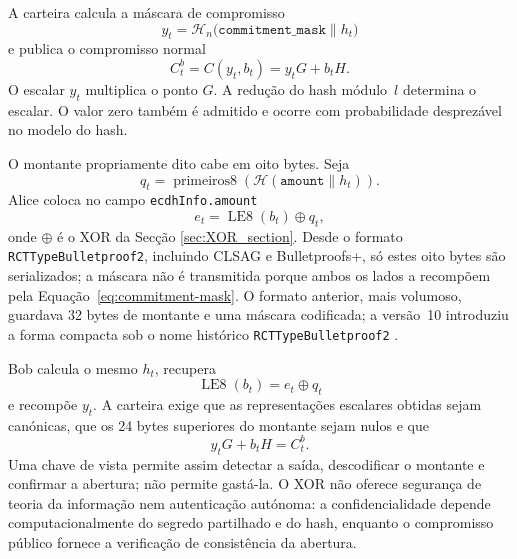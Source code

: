 A carteira calcula a máscara de compromisso
\begin{equation}
 y_t=\mathcal H_n\bigl(
       \texttt{commitment\_mask}\mathbin\|h_t\bigr)
 \label{eq:commitment-mask}
\end{equation}
e publica o compromisso normal
\begin{equation}
 C_t^b=C(y_t,b_t)=y_tG+b_tH.
 \label{eq:output-commitment}
\end{equation}
O escalar \(y_t\) multiplica o ponto \(G\). %
A redução do hash módulo~\(l\) determina o escalar. O valor zero também
é admitido e ocorre com probabilidade desprezável no modelo do hash.

O montante propriamente dito cabe em oito bytes. Seja
\[
 q_t=\operatorname{primeiros8}\!\left(
   \mathcal H(\texttt{amount}\mathbin\|h_t)\right).
\]
Alice coloca no campo \texttt{ecdhInfo.amount}
\begin{equation}
 e_t=\operatorname{LE8}(b_t)\mathbin\oplus q_t,
 \label{eq:encoded-amount}
\end{equation}
onde \(\oplus\) é o XOR da Secção \ref{sec:XOR_section}. Desde o formato
\texttt{RCTTypeBulletproof2}, incluindo CLSAG e Bulletproofs+, só estes oito
bytes são serializados; a máscara não é transmitida porque ambos os lados a
recompõem pela
Equação~\eqref{eq:commitment-mask}. O formato anterior, mais volumoso, guardava
32 bytes de montante e uma máscara codificada; a versão~10 introduziu a forma
compacta sob o nome histórico \texttt{RCTTypeBulletproof2}
\cite{monero-source-v16}.


%
Bob calcula o mesmo \(h_t\), recupera
\[
 \operatorname{LE8}(b_t)=e_t\mathbin\oplus q_t
\]
e recompõe \(y_t\). A carteira exige que as representações escalares obtidas
sejam canónicas, que os 24 bytes superiores do montante sejam nulos e que
\[
 y_tG+b_tH=C_t^b.
\]
Uma chave de vista permite assim detectar a saída, descodificar o montante e
confirmar a abertura; não permite gastá-la. O XOR não oferece segurança de
teoria da informação nem autenticação autónoma: a confidencialidade depende
computacionalmente do segredo partilhado e do hash, enquanto o compromisso
público fornece a verificação de consistência da abertura.


